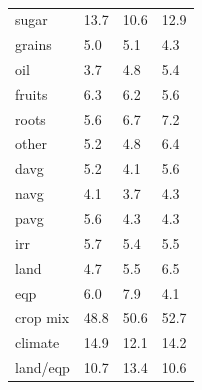 \documentclass[11pt]{article}
\begin{document}
\begin{table}[h!]
{\begin{tabular}{llll}
sugar & 13.7 & 10.6 & 12.9 \\
grains & 5.0 & 5.1 & 4.3 \\
oil & 3.7 & 4.8 & 5.4 \\
fruits & 6.3 & 6.2 & 5.6 \\
roots & 5.6 & 6.7 & 7.2 \\
other & 5.2 & 4.8 & 6.4 \\
davg & 5.2 & 4.1 & 5.6 \\
navg & 4.1 & 3.7 & 4.3 \\
pavg & 5.6 & 4.3 & 4.3 \\
irr & 5.7 & 5.4 & 5.5 \\
land & 4.7 & 5.5 & 6.5 \\
eqp & 6.0 & 7.9 & 4.1 \\
\midrule
crop mix & 48.8 & 50.6 & 52.7 \\
climate & 14.9 & 12.1 & 14.2 \\
land/eqp & 10.7 & 13.4 & 10.6 \\
\bottomrule
\end{tabular}
\caption{ }
\label{t.wy.temp_percentages}
}
\end{table}
\end{document}
